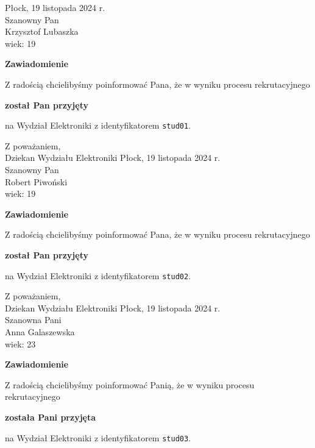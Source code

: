 \documentclass[12pt,a4paper]{article}
\begin{document}
\hfill Płock, 19 listopada 2024 r.\\ 
\noindent 
Szanowny Pan \\
Krzysztof Lubaszka \\
wiek: 19

\bigskip

\begin{center}
{\Large\textbf{Zawiadomienie}}
\end{center}
\bigskip
Z radością chcielibyśmy poinformować Pana, że w wyniku procesu rekrutacyjnego
\begin{center}
\textsf{\textbf{został Pan przyjęty}} 
\end{center}
na Wydział Elektroniki z identyfikatorem \verb|stud01|.
\vspace{2cm}

\noindent
Z poważaniem,\\
Dziekan
Wydziału Elektroniki
\newpage
\hfill Płock, 19 listopada 2024 r.\\ 
\noindent 
Szanowny Pan \\
Robert Piwoński  \\
wiek: 19

\bigskip

\begin{center}
{\Large\textbf{Zawiadomienie}}
\end{center}
\bigskip
Z radością chcielibyśmy poinformować Pana, że w wyniku procesu rekrutacyjnego
\begin{center}
\textsf{\textbf{został Pan przyjęty}} 
\end{center}
na Wydział Elektroniki z identyfikatorem \verb|stud02|.
\vspace{2cm}

\noindent
Z poważaniem,\\
Dziekan
Wydziału Elektroniki
\newpage
\hfill Płock, 19 listopada 2024 r.\\ 
\noindent 
Szanowna Pani \\
Anna Galaszewska  \\
wiek: 23

\bigskip

\begin{center}
{\Large\textbf{Zawiadomienie}}
\end{center}
\bigskip
Z radością chcielibyśmy poinformować Panią, że w wyniku procesu rekrutacyjnego
\begin{center}
\textsf{\textbf{została Pani przyjęta}} 
\end{center}
na Wydział Elektroniki z identyfikatorem \verb|stud03|.
\vspace{2cm}
\end{document}
